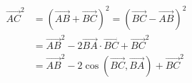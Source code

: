 \documentclass[preview]{standalone}
\begin{document}
\begin{align*}
\overrightarrow{AC}^2 &= (\overrightarrow{AB} + \overrightarrow{BC})^2 =(\overrightarrow{BC} - \overrightarrow{AB})^2\\&= \overrightarrow{AB}^2 - 2\overrightarrow{BA}\cdot\overrightarrow{BC} + \overrightarrow{BC}^2\\&= \overrightarrow{AB}^2 -2\cos\left(\overrightarrow{BC},\overrightarrow{BA}\right)+ \overrightarrow{BC}^2\\
\end{align*}
\end{document}
